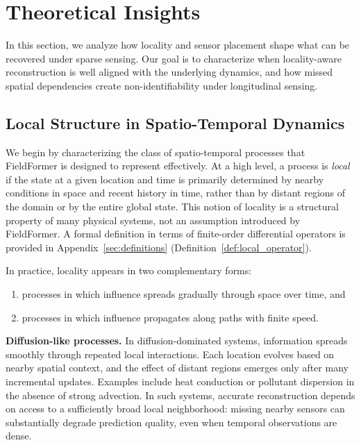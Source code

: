 \section{Theoretical Insights}
\label{sec:analysis}

In this section, we analyze how locality and sensor placement shape what can be recovered under sparse sensing. Our goal is to characterize when locality-aware reconstruction is well aligned with the underlying dynamics, and how missed spatial dependencies create non-identifiability under longitudinal sensing.
\subsection{Local Structure in Spatio-Temporal Dynamics}

We begin by characterizing the class of spatio-temporal processes that FieldFormer is designed to represent effectively. At a high level, a process is \emph{local} if the state at a given location and time is primarily determined by nearby conditions in space and recent history in time, rather than by distant regions of the domain or by the entire global state. This notion of locality is a structural property of many physical systems, not an assumption introduced by FieldFormer. A formal definition in terms of finite-order differential operators is provided in Appendix~\ref{sec:definitions} (Definition~\ref{def:local_operator}).

In practice, locality appears in two complementary forms:
\begin{enumerate}[leftmargin=*,topsep=0pt]
    \item processes in which influence spreads gradually through space over time, and
    \item processes in which influence propagates along paths with finite speed.
\end{enumerate}

\noindent\textbf{Diffusion-like processes.}
In diffusion-dominated systems, information spreads smoothly through repeated local interactions. Each location evolves based on nearby spatial context, and the effect of distant regions emerges only after many incremental updates. Examples include heat conduction or pollutant dispersion in the absence of strong advection. In such systems, accurate reconstruction depends on access to a sufficiently broad local neighborhood: missing nearby sensors can substantially degrade prediction quality, even when temporal observations are dense.


